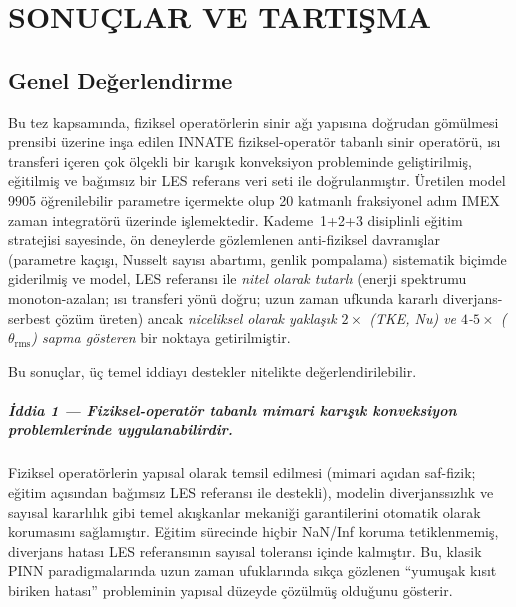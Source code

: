 \chapter{SONUÇLAR VE TARTIŞMA}
\label{ch:sonuc}

\section{Genel Değerlendirme}

Bu tez kapsamında, fiziksel operatörlerin sinir ağı yapısına doğrudan gömülmesi prensibi üzerine inşa edilen INNATE fiziksel-operatör tabanlı sinir operatörü, ısı transferi içeren çok ölçekli bir karışık konveksiyon probleminde geliştirilmiş, eğitilmiş ve bağımsız bir LES referans veri seti ile doğrulanmıştır. Üretilen model 9905 öğrenilebilir parametre içermekte olup 20 katmanlı fraksiyonel adım IMEX zaman integratörü üzerinde işlemektedir. Kademe~1+2+3 disiplinli eğitim stratejisi sayesinde, ön deneylerde gözlemlenen anti-fiziksel davranışlar (parametre kaçışı, Nusselt sayısı abartımı, genlik pompalama) sistematik biçimde giderilmiş ve model, LES referansı ile \emph{nitel olarak tutarlı} (enerji spektrumu monoton-azalan; ısı transferi yönü doğru; uzun zaman ufkunda kararlı diverjans-serbest çözüm üreten) ancak \emph{niceliksel olarak yaklaşık $2\times$ (TKE, Nu) ve $4$-$5\times$ ($\theta_{\mathrm{rms}}$) sapma gösteren} bir noktaya getirilmiştir.

Bu sonuçlar, üç temel iddiayı destekler nitelikte değerlendirilebilir.

\paragraph{İddia 1 --- Fiziksel-operatör tabanlı mimari karışık konveksiyon problemlerinde uygulanabilirdir.} Fiziksel operatörlerin yapısal olarak temsil edilmesi (mimari açıdan saf-fizik; eğitim açısından bağımsız LES referansı ile destekli), modelin diverjanssızlık ve sayısal kararlılık gibi temel akışkanlar mekaniği garantilerini otomatik olarak korumasını sağlamıştır. Eğitim sürecinde hiçbir NaN/Inf koruma tetiklenmemiş, diverjans hatası LES referansının sayısal toleransı içinde kalmıştır. Bu, klasik PINN paradigmalarında uzun zaman ufuklarında sıkça gözlenen ``yumuşak kısıt biriken hatası'' probleminin yapısal düzeyde çözülmüş olduğunu gösterir.

